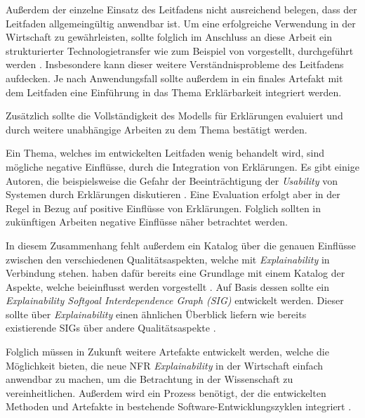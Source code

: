 Außerdem der einzelne Einsatz des Leitfadens nicht ausreichend belegen, dass der Leitfaden allgemeingültig anwendbar ist. Um eine erfolgreiche Verwendung in der Wirtschaft zu gewährleisten, sollte folglich im Anschluss an diese Arbeit ein strukturierter Technologietransfer wie zum Beispiel von \citeauthor{4012630} vorgestellt, durchgeführt werden \cite{4012630}. Insbesondere kann dieser weitere Verständnisprobleme des Leitfadens aufdecken. Je nach Anwendungsfall sollte außerdem in ein finales Artefakt mit dem Leitfaden eine Einführung in das Thema Erklärbarkeit integriert werden.

Zusätzlich sollte die Vollständigkeit des Modells für Erklärungen evaluiert und durch weitere unabhängige Arbeiten zu dem Thema bestätigt werden.

Ein Thema, welches im entwickelten Leitfaden wenig behandelt wird, sind mögliche negative Einflüsse, durch die Integration von Erklärungen. Es gibt einige Autoren, die beispielsweise die Gefahr der Beeinträchtigung der \textit{Usability} von Systemen durch Erklärungen diskutieren \cite{chazette_knowledge_nodate,koo_understanding_2016,kohl_explainability_2019}. Eine Evaluation erfolgt aber in der Regel in Bezug auf positive Einflüsse von Erklärungen. 
Folglich sollten in zukünftigen Arbeiten negative Einflüsse näher  betrachtet werden.

In diesem Zusammenhang fehlt außerdem ein Katalog über die genauen Einflüsse zwischen den verschiedenen Qualitätsaspekten, welche mit \textit{Explainability} in Verbindung stehen. \citeauthor{chazette_knowledge_nodate} haben dafür bereits eine Grundlage mit einem Katalog der Aspekte, welche beieinflusst werden vorgestellt \cite{chazette_knowledge_nodate}. Auf Basis dessen sollte ein \textit{Explainability Softgoal Interdependence Graph (SIG)} entwickelt werden. Dieser sollte über \textit{Explainability} einen ähnlichen Überblick liefern wie bereits existierende SIGs über andere Qualitätsaspekte \cite[vgl.][]{do2010software, carvalho2020developers}.

Folglich müssen in Zukunft weitere Artefakte entwickelt werden, welche die Möglichkeit bieten, die neue NFR \textit{Explainability} in der Wirtschaft einfach anwendbar zu machen, um die Betrachtung in der Wissenschaft zu vereinheitlichen\cite{sokol_explainability_2020}. Außerdem wird ein Prozess benötigt, der die entwickelten Methoden und Artefakte in bestehende Software-Entwicklungszyklen integriert \cite{kohl_explainability_2019, cassens_ambient_2019}.
